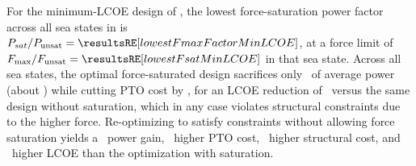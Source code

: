 \ifdefined\DISSERTATION
    For the minimum-LCOE design of , the lowest force-saturation power factor across all sea states in  is 
    $P_{sat}/P_{\text{unsat}}=\resultsRE[lowestFmaxFactorMinLCOE]$, at a force limit of $F_{\text{max}}/F_{\text{unsat}}=\resultsRE[lowestFsatMinLCOE]$ in that sea state.
    Across all sea states, the optimal force-saturated design sacrifices only 
    \resultsRE[powerLossForceSatMinLCOE]~of average power (about \resultsRE[pctPowerLossForceSatMinLCOE]) while cutting PTO cost by \resultsRE[pctPTOSavingsForceSatMinLCOE],
    for an LCOE reduction of \resultsRE[pctImproveLCOEForceSatMinLCOE]~versus the same design without saturation, which in any case violates structural constraints due to the higher force.
    Re-optimizing to satisfy constraints without allowing force saturation yields a
    \resultsRE[pctPowerGainForceSatOptMinLCOE]~power gain,
    \resultsRE[pctPTOCostIncreaseForceSatOptMinLCOE]~higher PTO cost,
    \resultsRE[pctStructCostIncreaseForceSatOptMinLCOE]~higher structural cost, and
    \resultsRE[pctLCOEIncreaseForceSatOptMinLCOE]~higher LCOE than the optimization with saturation.
\else
\fi

